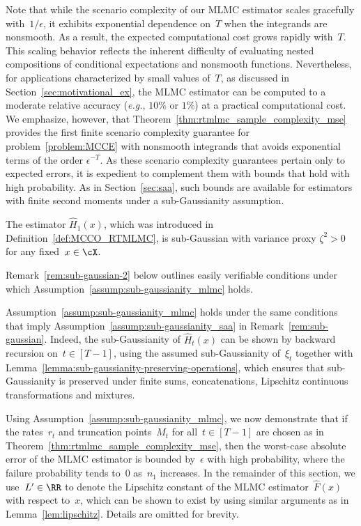 \documentclass[11pt]{article}
\let\hat\widehat
\begin{document}
Note that while the scenario complexity of our MLMC estimator scales gracefully with~$1/\epsilon$, it exhibits exponential dependence on~$T$ when the integrands are nonsmooth. As a result, the expected computational cost grows rapidly with~$T$. This scaling behavior reflects the inherent difficulty of evaluating nested compositions of conditional expectations and nonsmooth functions. Nevertheless, for applications characterized by small values of~$T$, as discussed in Section~\ref{sec:motivational_ex}, the MLMC estimator can be computed to a moderate relative accuracy ({\em e.g.}, $10\%$ or $1\%$) at a practical computational cost. We emphasize, however, that Theorem~\ref{thm:rtmlmc_sample_complexity_mse} provides the first finite scenario complexity guarantee for problem~\eqref{problem:MCCE} with nonsmooth integrands that avoids exponential terms of the order $\epsilon^{-T}$. As these scenario complexity guarantees pertain only to expected errors, it is expedient to complement them with bounds that hold with high probability. As in Section~\ref{sec:saa}, such bounds are available for estimators with finite second moments under a sub-Gaussianity assumption. 


\begin{assumption}[Sub-Gaussianity of $\hat H_1(x)$]
\label{assump:sub-gaussianity_mlmc} 
The estimator $\hat H_1(x)$, which was introduced in Definition~\ref{def:MCCO_RTMLMC}, is sub-Gaussian with variance proxy $\zeta^2>0$ for any fixed~$x\in\cX$.
\end{assumption}

Remark~\ref{rem:sub-gaussian-2} below outlines easily verifiable conditions under which Assumption~\ref{assump:sub-gaussianity_mlmc} holds.

\begin{rem}
\label{rem:sub-gaussian-2}
    \!Assumption~\ref{assump:sub-gaussianity_mlmc} holds under the same conditions that imply Assumption~\ref{assump:sub-gaussianity_saa} in Remark~\ref{rem:sub-gaussian}. Indeed, the sub-Gaussianity of $\hat H_t(x)$ can be shown by backward recursion on~$t\in[T-1]$, using the assumed sub-Gaussianity of~$\xi_t$ together with Lemma~\ref{lemma:sub-gaussianity-preserving-operations}, which ensures that sub-Gaussianity is preserved under finite sums, concatenations, Lipschitz continuous transformations and mixtures.
\end{rem}

Using Assumption~\ref{assump:sub-gaussianity_mlmc}, we now demonstrate that if the rates~$r_t$ and truncation points~$M_t$ for all~$t \in [T-1]$ are chosen as in Theorem~\ref{thm:rtmlmc_sample_complexity_mse}, then the worst-case absolute error of the MLMC estimator is bounded by~$\epsilon$ with high probability, where the failure probability tends to~$0$ as~$n_1$ increases. In the remainder of this section, we use~$L'\in\RR$ to denote the Lipschitz constant of the MLMC estimator~$\hat{F}(x)$ with respect to~$x$, which can be shown to exist by using similar arguments as in Lemma~\ref{lem:lipschitz}. Details are omitted for brevity.
\end{document}
